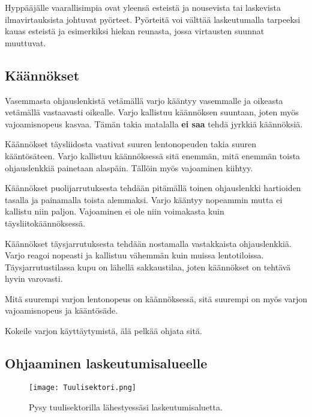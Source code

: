 \begin{multicols}{2}
Hyppääjälle vaarallisimpia ovat yleensä esteistä ja nousevista tai laskevista ilmavirtauksista johtuvat pyörteet. Pyörteitä voi välttää laskeutumalla tarpeeksi kauas esteistä ja esimerkiksi hiekan reunasta, jossa virtausten suunnat muuttuvat. 

\subsection{ Käännökset }
\label{hyppytapahtuma-kaannokset}


Vasemmasta ohjauslenkistä vetämällä varjo kääntyy vasemmalle ja oikeasta vetämällä vastaavasti oikealle. Varjo kallistuu käännöksen suuntaan, joten myös vajoamisnopeus kasvaa. Tämän takia matalalla \textbf{ei saa} tehdä jyrkkiä käännöksiä. 


Käännökset täysliidosta vaativat suuren lentonopeuden takia suuren kääntösäteen. Varjo kallistuu käännöksessä sitä enemmän, mitä enemmän toista ohjauslenkkiä painetaan alaspäin. Tällöin myös vajoaminen kiihtyy. 


Käännökset puolijarrutuksesta tehdään pitämällä toinen ohjauslenkki hartioiden tasalla ja painamalla toista alemmaksi. Varjo kääntyy nopeammin mutta ei kallistu niin paljon. Vajoaminen ei ole niin voimakasta kuin täysliitokäännöksessä. 


Käännökset täysjarrutuksesta tehdään nostamalla vastakkaista ohjauslenkkiä. Varjo reagoi nopeasti ja kallistuu vähemmän kuin muissa lentotiloissa. Täysjarrutustilassa kupu on lähellä sakkaustilaa, joten käännökset on tehtävä hyvin varovasti. 


Mitä suurempi varjon lentonopeus on käännöksessä, sitä suurempi on myös varjon vajoamisnopeus ja kääntösäde. 


Kokeile varjon käyttäytymistä, älä pelkää ohjata sitä. 

\subsection{ Ohjaaminen laskeutumisalueelle }
\label{hyppytapahtuma-ohjaaminen-laskeutumisalueelle}


\begin{figure*}[]\centering\texttt{[image: Tuulisektori.png]}\caption{Pysy tuulisektorilla lähestyessäsi laskeutumisaluetta.}\end{figure*} 



\end{multicols}
